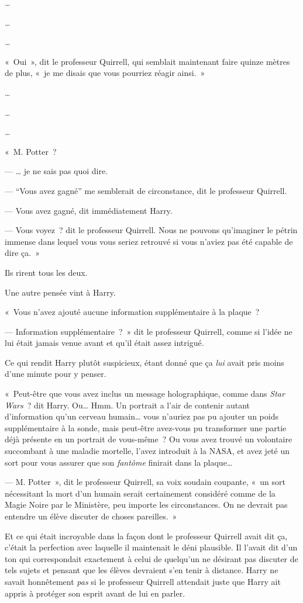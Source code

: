 …

…

…

«~Oui~», dit le professeur Quirrell, qui semblait maintenant faire quinze mètres de plus, «~je me disais que vous pourriez réagir ainsi.~»

…

…

…

«~M. Potter~?

--- … je ne sais pas quoi dire.

--- “Vous avez gagné” me semblerait de circonstance, dit le professeur Quirrell.

--- Vous avez gagné, dit immédiatement Harry.

--- Vous voyez~? dit le professeur Quirrell.
Nous ne pouvons qu'imaginer le pétrin immense dans lequel vous vous seriez retrouvé si vous n'aviez pas été capable de dire ça.~»

Ils rirent tous les deux.

Une autre pensée vint à Harry.

«~Vous n'avez ajouté aucune information supplémentaire à la plaque~?

--- Information supplémentaire~?~»
dit le professeur Quirrell, comme si l'idée ne lui était jamais venue avant et qu'il était assez intrigué.

Ce qui rendit Harry plutôt suspicieux, étant donné que ça \emph{lui} avait pris moins d'une minute pour y penser.

«~Peut-être que vous avez inclus un message holographique, comme dans \emph{Star Wars}~? dit Harry.
Ou… Hmm.
Un portrait a l'air de contenir autant d'information qu'un cerveau humain… vous n'auriez pas pu ajouter un poids supplémentaire à la sonde, mais peut-être avez-vous pu transformer une partie déjà présente en un portrait de vous-même~?
Ou vous avez trouvé un volontaire succombant à une maladie mortelle, l'avez introduit à la NASA, et avez jeté un sort pour vous assurer que son \emph{fantôme} finirait dans la plaque…

--- M. Potter~», dit le professeur Quirrell, sa voix soudain coupante, «~un sort nécessitant la mort d'un humain serait certainement considéré comme de la Magie Noire par le Ministère, peu importe les circonstances.
On ne devrait pas entendre un élève discuter de choses pareilles.~»

Et ce qui était incroyable dans la façon dont le professeur Quirrell avait dit ça, c'était la perfection avec laquelle il maintenait le déni plausible.
Il l'avait dit d'un ton qui correspondait exactement à celui de quelqu'un ne désirant pas discuter de tels sujets et pensant que les élèves devraient s'en tenir à distance.
Harry ne savait honnêtement \emph{pas} si le professeur Quirrell attendait juste que Harry ait appris à protéger son esprit avant de lui en parler.

